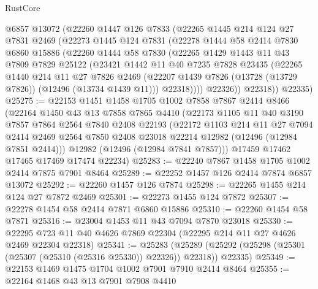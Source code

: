\begin{lexlean}{RustCore}
\begin{coremodule}
      @6857
      @13072
      (@22260
        @1447
        @126
        @7833
        (@22265
          @1445
          @214
          @124
          @27
          @7831
          @2469
          (@22273
            @1445
            @124
            @7831
            (@22278
              @1444
              @58
              @2414
              @7830
              @6860
              @15886
              (@22260
                @1444
                @58
                @7830
                (@22265
                  @1429
                  @1443
                  @11
                  @43
                  @7809
                  @7829
                  @25122
                  (@23421
                    @1442
                    @11
                    @40
                    @7235
                    @7828
                    @23435
                    (@22265
                      @1440
                      @214
                      @11
                      @27
                      @7826
                      @2469
                      (@22207 @1439 @7826 (@13728 (@13729 @7826)) (@12496 (@13734 @1439 @11)))
                      @22318))))
              @22326))
          @22318))
      @22335)
@25275 := @22153
    @1451
    @1458
    @1705
    @1002
    @7858
    @7867
    @2414
    @8466
    (@22164
      @1450
      @43
      @13
      @7858
      @7865
      @4410
      (@22173
        @1105
        @11
        @40
        @3190
        @7857
        @7864
        @2564
        @7840
        @2408
        @22193
        (@22172
          @1103
          @214
          @11
          @27
          @7094
          @2414
          @2469
          @2564
          @7850
          @2408
          @23018
          @22214
          @12982
          (@12496 (@12984 @7851 @2414)))
        @12982
        (@12496 (@12984 @7841 @7857)))
      @17459
      @17462
      @17465
      @17469
      @17474
      @22234)
@25283 := @22240 @7867 @1458 @1705 @1002 @2414 @7875 @7901 @8464
@25289 := @22252 @1457 @126 @2414 @7874 @6857 @13072
@25292 := @22260 @1457 @126 @7874
@25298 := @22265 @1455 @214 @124 @27 @7872 @2469
@25301 := @22273 @1455 @124 @7872
@25307 := @22278 @1454 @58 @2414 @7871 @6860 @15886
@25310 := @22260 @1454 @58 @7871
@25316 := @23004 @1453 @11 @43 @7094 @7870 @23018
@25330 := @22295 @723 @11 @40 @4626 @7869 @22304 (@22295 @214 @11 @27 @4626 @2469 @22304 @22318)
@25341 := @25283
    (@25289 (@25292 (@25298 (@25301 (@25307 (@25310 (@25316 @25330)) @22326)) @22318)) @22335)
@25349 := @22153 @1469 @1475 @1704 @1002 @7901 @7910 @2414 @8464
@25355 := @22164 @1468 @43 @13 @7901 @7908 @4410

\end{coremodule}
\end{lexlean}
